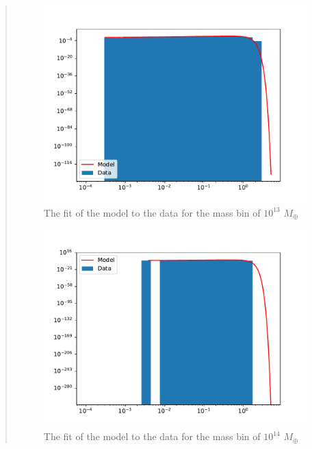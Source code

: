 \begin{quote}
\begin{figure}[!ht]
\centering
\includegraphics[scale=0.7]{plots/satgals_m13.pdf}
\caption{The fit of the model to the data for the mass bin of $10^13$ $M_{\oplus}$}
\end{figure}
\begin{figure}[!hb]
\centering
\includegraphics[scale=0.7]{plots/satgals_m14.pdf}
\caption{The fit of the model to the data for the mass bin of $10^14$ $M_{\oplus}$}
\end{figure}
\newpage


\end{quote}
